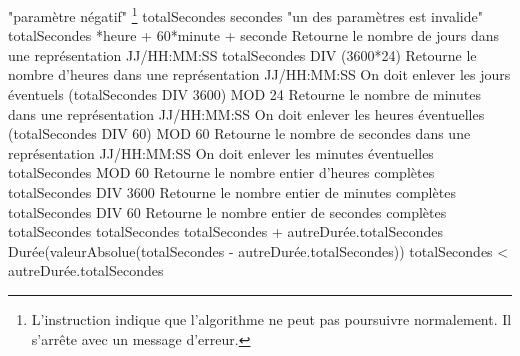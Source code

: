 		\begin{LDA}
					\Stmt {} "paramètre négatif"%
					\footnote{%
						L'instruction  indique
						que l'algorithme ne peut pas poursuivre normalement.
						Il s'arrête avec un message d'erreur.
					}					
				\EndIf
				\Let totalSecondes \Gets secondes
			\EndConstr
		\Empty
					\Stmt {} "un des paramètres est invalide"
				\EndIf
				\Let totalSecondes *heure + 60*minute + seconde
			\EndConstr
		\Empty
			\LComment Retourne le nombre de jours dans une 
			représentation JJ/HH:MM:SS
				\Return totalSecondes DIV (3600*24)
			\EndMethod
		\Empty
			\LComment Retourne le nombre d'heures dans une 
			représentation JJ/HH:MM:SS
				\LComment On doit enlever les jours éventuels
				\Return (totalSecondes DIV 3600) MOD 24
			\EndMethod
		\Empty
			\LComment Retourne le nombre de minutes dans une 
			représentation JJ/HH:MM:SS
				\LComment On doit enlever les heures éventuelles
				\Return (totalSecondes DIV 60) MOD 60
			\EndMethod
		\Empty
			\LComment Retourne le nombre de secondes dans une 
			représentation JJ/HH:MM:SS
				\LComment On doit enlever les minutes éventuelles
				\Return totalSecondes  MOD 60
			\EndMethod
		\Empty
			\LComment Retourne le nombre entier d’heures complètes
				\Return totalSecondes DIV 3600
			\EndMethod
		\Empty
			\LComment Retourne le nombre entier de minutes complètes
				\Return totalSecondes DIV 60
			\EndMethod
		\Empty
			\LComment Retourne le nombre entier de secondes complètes
				\Return totalSecondes
			\EndMethod
		\Empty
				\Let totalSecondes \Gets totalSecondes + autreDurée.totalSecondes
			\EndMethod
		\Empty
				\Return {} Durée(valeurAbsolue(totalSecondes - autreDurée.totalSecondes))
			\EndMethod
		\Empty
				\Return totalSecondes < autreDurée.totalSecondes
			\EndMethod
		\end{LDA}
	
